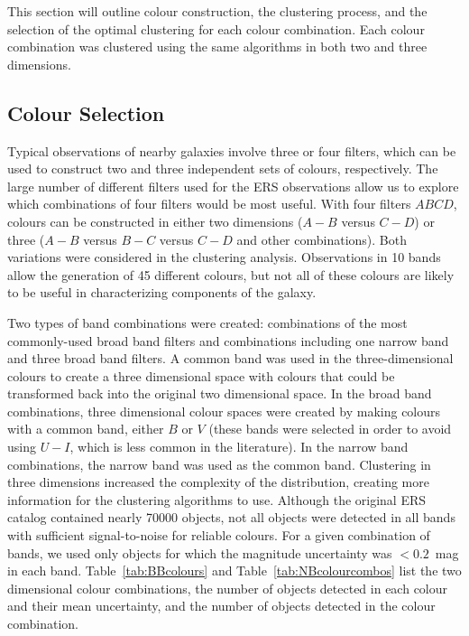 This section will outline colour construction, the clustering process, and the selection of the optimal clustering for each colour combination.
Each colour combination was clustered using the same algorithms in both two and three dimensions.

\subsection{Colour Selection}

Typical observations of nearby galaxies involve three or four filters, %
which can be used to construct two and three independent sets of colours, respectively. %
The large number of different filters used for the ERS observations allow us to explore which combinations of four filters would be most useful.
With four filters $ABCD$, colours can be constructed in either two dimensions ($A-B$ versus $C-D$) or three ($A-B$ versus $B-C$ versus $C-D$ and other combinations).
Both variations were considered in the clustering analysis.
Observations in 10 bands allow the generation of 45 different colours, but not all of these colours are likely to be useful in characterizing components of the galaxy.

Two types of band combinations were created: combinations of the most commonly-used broad band filters and combinations including one narrow band and three broad band filters.
A common band was used in the three-dimensional colours to create a three dimensional space with colours that could be transformed back into the original two dimensional space. 
In the broad band combinations, three dimensional colour spaces were created by making colours with a common band, either $B$ or $V$
(these bands were selected in order to avoid using $U - I$, which is less common in the literature).
In the narrow band combinations, the narrow band was used as the common band.
Clustering in three dimensions increased the complexity of the distribution, creating more information for the clustering algorithms to use. %
Although the original ERS catalog contained nearly 70000 objects, not all objects were detected in all bands with sufficient signal-to-noise for reliable colours. 
For a given combination of bands, we used only objects for which the magnitude uncertainty was $<0.2$~mag in each band.
Table~\ref{tab:BBcolours} and Table~\ref{tab:NBcolourcombos} list the two dimensional colour combinations, the number of objects detected in each colour and their mean uncertainty, and the number of objects detected in the colour combination.


